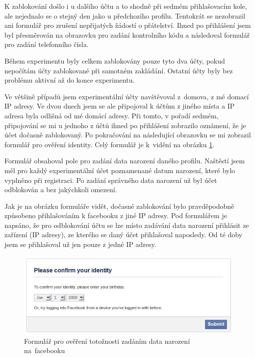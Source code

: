 \documentclass[thesis=M,czech]{FITthesis}[2013/05/10]
\begin{document}
K zablokování došlo i u dalšího účtu a to shodně při sedmém přihlašovacím kole, ale nejednalo se o stejný den jako u předchozího profilu. Tentokrát se nezobrazil ani formulář pro zrušení nepřijatých žádostí o přátelství. Ihned po přihlášení jsem byl přesměrován na obrazovku pro zadání kontrolního kódu a následoval formulář pro zadání telefonního čísla.

Během experimentu byly celkem zablokovány pouze tyto dva účty, pokud nepočítám účty zablokované při samotném zakládání. Ostatní účty byly bez problému aktivní až do konce experimentu.

Ve většině případů jsem experimentální účty navštěvoval z~domova, z mé domací IP adresy. Ve dvou dnech jsem se ale připojoval k účtům z jiného místa a IP adresa byla odlišná od mé domácí adresy. Při tomto, v pořadí sedmém, připojování se mi u jednoho z účtů ihned po přihlášení zobrazilo oznámení, že je účet dočasně zablokovaný. Po pokračování na následující obrazovku se mi zobrazil formulář pro ověření identity. Celý formulář je k~vidění na obrázku \ref{fig:confirmIdentity}.

Formulář obsahoval pole pro zadání data narození daného profilu. Naštěstí jsem měl pro každý experimentální účet poznamenané datum narození, které bylo vyplněno při registraci. Po zadání správného data narození už byl účet odblokován a bez jakýchkoli omezení. 

Jak je na obrázku formuláře vidět, dočasné zablokování bylo pravděpodobně způsobeno přihlašováním k facebooku z jiné IP adresy. Pod formulářem je napsáno, že pro odblokování účtu se lze místo zadávání data narození přihlásit ze zařízení (IP adresy), ze kterého se daný účet přihlašoval naposledy. Od té doby jsem se přihlašoval už jen pouze z jedné IP adresy.

\begin{figure}[h]
\begin{center}
\includegraphics[width=5in]{figures/confirmIdentity.png}
\caption{Formulář pro ověření totožnosti zadáním data narození na~facebooku}
\label{fig:confirmIdentity}
\end{center}
\end{figure}
\end{document}

